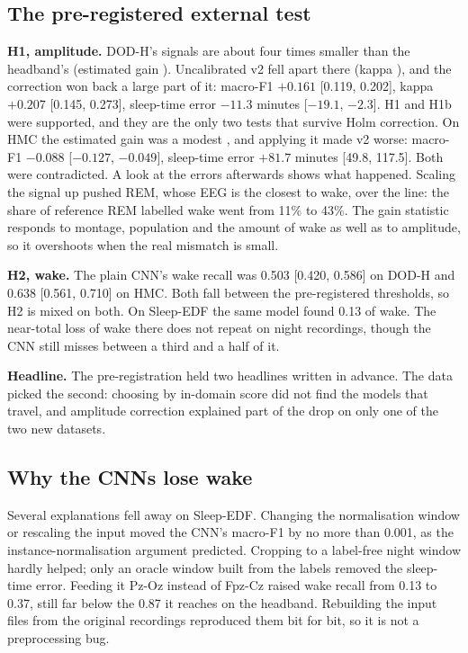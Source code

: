 \documentclass[10pt,twocolumn]{article}
\begin{document}
\begin{table}[t]
\centering\small
\caption{Main benchmark, whole-recording window. Mean over people, with 95\% bootstrap intervals.
BOAS: 20 people; Sleep-EDF: 20; DOD-H: 25; HMC: 25.}
\label{tab:bench}

\end{table}

\subsection{The pre-registered external test}

\textbf{H1, amplitude.} DOD-H's signals are about four times smaller than the headband's (estimated
gain ). Uncalibrated v2 fell apart there (kappa ), and the
correction won back a large part of it: macro-F1 $+0.161$ [0.119, 0.202], kappa $+0.207$ [0.145, 0.273],
sleep-time error $-11.3$ minutes [$-19.1$, $-2.3$]. H1 and H1b were supported, and they are the only
two tests that survive Holm correction. On HMC the estimated gain was a modest ,
and applying it made v2 worse: macro-F1 $-0.088$ [$-0.127$, $-0.049$], sleep-time error $+81.7$ minutes
[49.8, 117.5]. Both were contradicted. A look at the errors afterwards shows what happened. Scaling the
signal up pushed REM, whose EEG is the closest to wake, over the line: the share of reference REM
labelled wake went from 11\% to 43\%. The gain statistic responds to montage, population and the
amount of wake as well as to amplitude, so it overshoots when the real mismatch is small.

\textbf{H2, wake.} The plain CNN's wake recall was 0.503 [0.420, 0.586] on DOD-H and 0.638
[0.561, 0.710] on HMC. Both fall between the pre-registered thresholds, so H2 is mixed on both. On
Sleep-EDF the same model found 0.13 of wake. The near-total loss of wake there does not repeat on
night recordings, though the CNN still misses between a third and a half of it.

\textbf{Headline.} The pre-registration held two headlines written in advance. The data picked the
second: choosing by in-domain score did not find the models that travel, and amplitude correction
explained part of the drop on only one of the two new datasets.

\subsection{Why the CNNs lose wake}

Several explanations fell away on Sleep-EDF. Changing the normalisation window or rescaling the input
moved the CNN's macro-F1 by no more than 0.001, as the instance-normalisation argument predicted.
Cropping to a label-free night window hardly helped; only an oracle window built from the labels
removed the sleep-time error. Feeding it Pz-Oz instead of Fpz-Cz raised wake recall from 0.13 to 0.37,
still far below the 0.87 it reaches on the headband. Rebuilding the input files from the original
recordings reproduced them bit for bit, so it is not a preprocessing bug.
\end{document}
